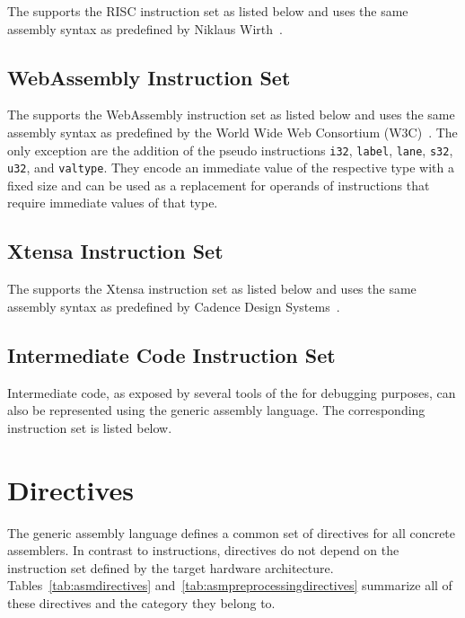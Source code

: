 The \ecs{} supports the RISC instruction set as listed below and uses the same assembly syntax as predefined by Niklaus Wirth~\cite{risc:instructionset}.
\seerisc


\subsection{WebAssembly Instruction Set}

The \ecs{} supports the WebAssembly instruction set as listed below and uses the same assembly syntax as predefined by the World Wide Web Consortium (W3C)~\cite{wasm:instructionset}.
The only exception are the addition of the pseudo instructions \texttt{i32}, \texttt{label}, \texttt{lane}, \texttt{s32}, \texttt{u32}, and \texttt{valtype}.
They encode an immediate value of the respective type with a fixed size and can be used as a replacement for operands of instructions that require immediate values of that type.
\seewasm


\subsection{Xtensa Instruction Set}

The \ecs{} supports the Xtensa instruction set as listed below and uses the same assembly syntax as predefined by Cadence Design Systems~\cite{xtensa:instructionset}.
\seextensa


\subsection{Intermediate Code Instruction Set}

Intermediate code, as exposed by several tools of the \ecs{} for debugging purposes, can also be represented using the generic assembly language.
The corresponding instruction set is listed below.
\seecode


\section{Directives}\label{sec:asmdirectives}

The generic assembly language defines a common set of directives for all concrete assemblers.
In contrast to instructions, directives do not depend on the instruction set defined by the target hardware architecture.
Tables~\ref{tab:asmdirectives} and~\ref{tab:asmpreprocessingdirectives} summarize all of these directives and the category they belong to.

